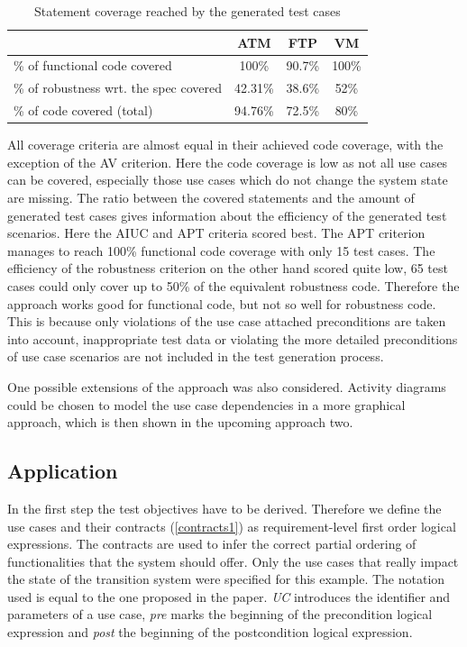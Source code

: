 \begin{table}[h] 
	\centering
	\begin{small}
		\caption{Statement coverage reached by the generated test cases}
		\label{codecoverage}
		\setlength{\tabcolsep}{1em}
		\begin{tabular}{l|c|c|c}
			\hline
			& \textbf{ATM} & \textbf{FTP} & \textbf{VM} \\
			\hline
			\hline	
			\% of functional code covered & 100\% & 90.7\% & 100\% \\
			\hline
			\% of robustness wrt. the spec covered & 42.31\% & 38.6\% & 52\% \\
			\hline
			\% of code covered (total) & 94.76\% & 72.5\% & 80\% \\
			\hline
		\end{tabular}
	\end{small}
\end{table}

All coverage criteria are almost equal in their achieved code coverage, with the exception of the AV criterion. Here the code coverage is low as not all use cases can be covered, especially those use cases which do not change the system state are missing. The ratio between the covered statements and the amount of generated test cases gives information about the efficiency of the generated test scenarios. Here the AIUC and APT criteria scored best. The APT criterion manages to reach 100\% functional code coverage with only 15 test cases. The efficiency of the robustness criterion on the other hand scored quite low, 65 test cases could only cover up to 50\% of the equivalent robustness code. Therefore the approach works good for functional code, but not so well for robustness code. This is because only violations of the use case attached preconditions are taken into account, inappropriate test data or violating the more detailed preconditions of use case scenarios are not included in the test generation process. 

One possible extensions of the approach was also considered. Activity diagrams could be chosen to model the use case dependencies in a more graphical approach, which is then shown in the upcoming approach two. 

\subsection{Application}

In the first step the test objectives have to be derived. Therefore we define the use cases and their contracts (\autoref{contracts1}) as requirement-level first order logical expressions. The contracts are used to infer the correct partial ordering of functionalities that the system should offer. Only the use cases that really impact the state of the transition system were specified for this example. The notation used is equal to the one proposed in the paper. \textit{UC} introduces the identifier and parameters of a use case, \textit{pre} marks the beginning of the precondition logical expression and \textit{post} the beginning of the postcondition logical expression. 

